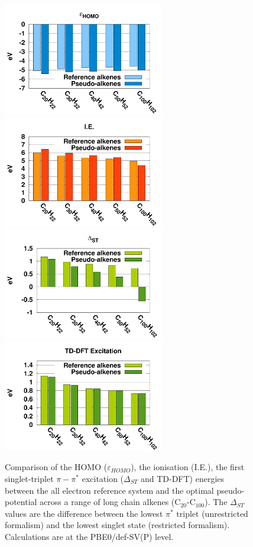 \documentclass[aip]{revtex4-1}
\begin{document}
\begin{figure}
\begin{center}
\includegraphics[width=7cm]{long_pbe0_homo}
\includegraphics[width=7cm]{long_pbe0_ie}
\includegraphics[width=7cm]{long_pbe0_st}
\includegraphics[width=7cm]{long_pbe0_tddft}
\end{center}

\caption{Comparison of the HOMO ($\varepsilon_{HOMO}$),
the ionisation (I.E.),
the first singlet-triplet $\pi-\pi^*$ excitation ($\Delta_{ST}$ and TD-DFT) energies
between the
all electron reference system and the optimal pseudo-potential across a range of long chain alkenes (C\(_{20}\)-C\(_{100}\)).
The $\Delta_{ST}$ values are the difference
between the lowest $\pi^*$  triplet (unrestricted formalism) and the lowest singlet state
(restricted formalism).
Calculations are at the PBE0/def-SV(P) level.}
\label{fig:long_chain_graphs}
\end{figure}
\end{document}
